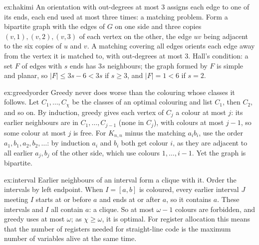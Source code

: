 \begin{solution}{ex:hakimi}
\idea An orientation with out-degrees at most $3$ assigns each edge to one of its ends, each end used at most three times: a matching problem.
\writeup Form a bipartite graph with the edges of $G$ on one side and three copies $(v,1),(v,2),(v,3)$ of each vertex on the other, the edge $uv$ being adjacent to the six copies of $u$
and $v$. A matching covering all edges orients each edge away from the vertex it is matched to, with out-degrees at most $3$. Hall's condition: a set $F$ of edges with
$s$ ends has $3s$ neighbours; the graph formed by $F$ is simple and planar, so $|F|\le3s-6<3s$ if $s\ge3$, and $|F|=1<6$ if $s=2$.
\end{solution}

\begin{solution}{ex:greedyorder}
\idea Greedy never does worse than the colouring whose classes it follows.
\writeup Let $C_1,\dots,C_\chi$ be the classes of an optimal colouring and list $C_1$, then $C_2$, and so on. By induction, greedy gives each vertex of $C_j$ a colour at most $j$: its
earlier neighbours are in $C_1,\dots,C_{j-1}$ (none in $C_j$), with colours at most $j-1$, so some colour at most $j$ is free. For $K_{n,n}$ minus the matching $a_ib_i$, use the order
$a_1,b_1,a_2,b_2,\dots$: by induction $a_i$ and $b_i$ both get colour $i$, as they are adjacent to all earlier $a_j,b_j$ of the other side, which use colours $1,\dots,i-1$. Yet
the graph is bipartite.
\end{solution}

\begin{solution}{ex:interval}
\idea Earlier neighbours of an interval form a clique with it.
\writeup Order the intervals by left endpoint. When $I=[a,b]$ is coloured, every earlier interval $J$ meeting $I$ starts at or before $a$ and ends at or after $a$, so it contains $a$.
These intervals and $I$ all contain $a$: a clique. So at most $\omega-1$ colours are forbidden, and greedy uses at most $\omega$; as $\chi\ge\omega$, it is optimal. For register allocation
this means that the number of registers needed for straight-line code is the maximum number of variables alive at the same time.
\end{solution}

